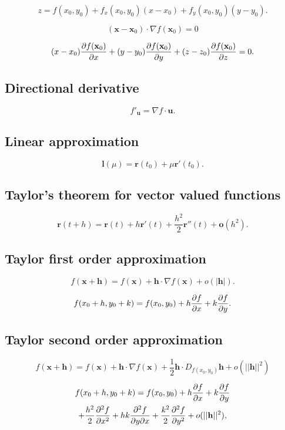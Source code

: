 \documentclass[12pt, a4paper]{article}
\theoremstyle{definition}
\theoremstyle{plain}
\begin{document}
$$z= f(x_0, y_0)+ f_x(x_0, y_0)(x-x_0)+ f_y(x_0, y_0)(y-y_0).$$

$$(\mathbf{x} - \mathbf{x}_0) \cdot \nabla f(\mathbf{x}_0) = 0$$

$$(x-x_0)\pdv{f(\mathbf{x}_0)}{x}+(y-y_0)\pdv{f(\mathbf{x}_0)}{y}+(z-z_0)\pdv{f(\mathbf{x}_0)}{z}=0.$$

\subsection{Directional derivative}

$$f'_{\mathbf{u}}=\nabla f \cdot \mathbf{u}.$$

\subsection{Linear approximation}

$$\mathbf{l}(\mu) = \mathbf{r}(t_0) + \mu \mathbf{r}'(t_0).$$

\subsection{Taylor's theorem for vector valued functions}

$$\mathbf{r}(t+h)=\mathbf{r}(t)+h\mathbf{r'}(t)+ \frac{h^2}{2}\mathbf{r''}(t)+\mathbf{o}(h^2).$$

\subsection{Taylor first order approximation}

$$f(\mathbf{x+h})=f(\mathbf{x})+\mathbf{h}\cdot \nabla f(\mathbf{x})+o(|\mathbf{h}|).$$

$$f(x_0 +h,y_0 +k) = f(x_0,y_0)+h\pdv{f}{x}(x_0,y_0)+k\pdv{f}{y}(x_0,y_0).$$

\subsection{Taylor second order approximation}

$$f(\mathbf{x+h})=f(\mathbf{x})+\mathbf{h}\cdot \nabla f(\mathbf{x})+\frac{1}{2}\mathbf{h}\cdot D_{f(x_0,y_0)}\mathbf{h}+o(||\mathbf{h}||^2)$$

\begin{multline*}
f(x_0 +h,y_0 +k) = f(x_0,y_0)+h\pdv{f}{x}(x_0,y_0)+k\pdv{f}{y}(x_0,y_0) \\
+\frac{h^2}{2}\pdv[2]{f}{x}(x_0,y_0)+hk\pdv[2]{f}{y}{x}(x_0,y_0)+\frac{k^2}{2}\pdv[2]{f}{y}(x_0,y_0) +o(||\mathbf{h}||^2),
\end{multline*}
\end{document}
